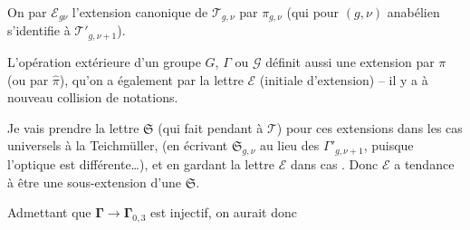 On   par $\mathcal E_{g\nu}$ l'extension canonique de $\mathcal T_{g,\nu}$ par $\pi_{g,\nu}$ (qui pour $(g,\nu)$ anabélien s'identifie à $\mathcal T'_{g,\nu+1}$).

L'opération extérieure d'un groupe $G$, $\Gamma$ ou $\mathcal G$ définit aussi une extension par $\pi$ (ou par $\widehat{\pi}$), qu'on a également  par la lettre $\mathcal E$ (initiale d'extension) -- il y a à nouveau collision de notations.


Je vais prendre la lettre $\mathfrak{S}$ (qui fait pendant à $\mathcal{T}$) pour ces extensions dans les cas universels à la Teichmüller, (en écrivant $\mathfrak{S}_{g,\nu}$ au lieu des $\Gamma'_{g,\nu+1}$, puisque l'optique est différente\ldots), et en gardant la lettre $\mathcal{E}$ dans  cas . Donc $\mathcal{E}$ a tendance à être une sous-extension d'une $\mathfrak{S}$.

Admettant que $\boldsymbol{\Gamma}\longrightarrow\boldsymbol{\Gamma}_{0,3}$ est injectif, on aurait donc



